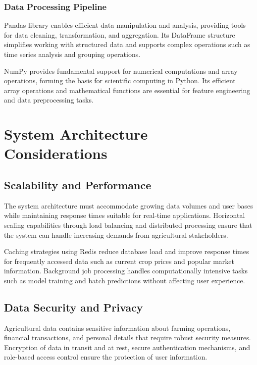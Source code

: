 \subsubsection{Data Processing Pipeline}
Pandas library enables efficient data manipulation and analysis, providing tools for data cleaning, transformation, and aggregation. Its DataFrame structure simplifies working with structured data and supports complex operations such as time series analysis and grouping operations.

NumPy provides fundamental support for numerical computations and array operations, forming the basis for scientific computing in Python. Its efficient array operations and mathematical functions are essential for feature engineering and data preprocessing tasks.

\section{System Architecture Considerations}

\subsection{Scalability and Performance}

The system architecture must accommodate growing data volumes and user bases while maintaining response times suitable for real-time applications. Horizontal scaling capabilities through load balancing and distributed processing ensure that the system can handle increasing demands from agricultural stakeholders.

Caching strategies using Redis reduce database load and improve response times for frequently accessed data such as current crop prices and popular market information. Background job processing handles computationally intensive tasks such as model training and batch predictions without affecting user experience.

\subsection{Data Security and Privacy}

Agricultural data contains sensitive information about farming operations, financial transactions, and personal details that require robust security measures. Encryption of data in transit and at rest, secure authentication mechanisms, and role-based access control ensure the protection of user information.

